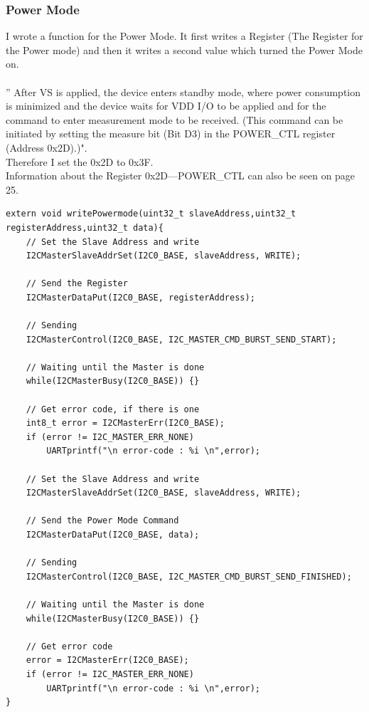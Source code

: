 \documentclass[12pt]{article}
\begin{document}
\subsubsection{Power Mode}
I wrote a function for the Power Mode.
It first writes a Register (The Register for the Power mode) and then it writes a second value which turned the Power Mode on. \\
\\
'' After VS is applied, the device enters standby mode, where power
consumption is minimized and the device waits for VDD I/O to be
applied and for the command to enter measurement mode to be
received.  (This command can be initiated by setting the measure
bit (Bit D3) in the POWER\_CTL register (Address 0x2D).)"\cite[page 13]{datasheetADXL}. \\
Therefore I set the 0x2D to 0x3F.
\\ Information about the Register 0x2D—POWER\_CTL can also be seen on page 25.
\begin{lstlisting} 
extern void writePowermode(uint32_t slaveAddress,uint32_t registerAddress,uint32_t data){
    // Set the Slave Address and write
    I2CMasterSlaveAddrSet(I2C0_BASE, slaveAddress, WRITE);

    // Send the Register
    I2CMasterDataPut(I2C0_BASE, registerAddress);
   
    // Sending
    I2CMasterControl(I2C0_BASE, I2C_MASTER_CMD_BURST_SEND_START);
 
    // Waiting until the Master is done
    while(I2CMasterBusy(I2C0_BASE)) {}

    // Get error code, if there is one
    int8_t error = I2CMasterErr(I2C0_BASE);
    if (error != I2C_MASTER_ERR_NONE)
		UARTprintf("\n error-code : %i \n",error);

    // Set the Slave Address and write
    I2CMasterSlaveAddrSet(I2C0_BASE, slaveAddress, WRITE);

    // Send the Power Mode Command
    I2CMasterDataPut(I2C0_BASE, data);

    // Sending
    I2CMasterControl(I2C0_BASE, I2C_MASTER_CMD_BURST_SEND_FINISHED);

    // Waiting until the Master is done
    while(I2CMasterBusy(I2C0_BASE)) {}
   
    // Get error code
    error = I2CMasterErr(I2C0_BASE);
    if (error != I2C_MASTER_ERR_NONE)
		UARTprintf("\n error-code : %i \n",error);
}
\end{lstlisting} 
\end{document}
